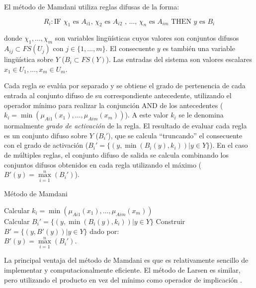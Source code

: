 El método de Mamdani utiliza reglas difusas de la forma:

\begin{equation}
R_{i}: \text{IF }\chi_{1}\text{ es }A_{i1}\text{, }\chi_{2}\text{ es }A_{i2}\text{ , \ldots , }\chi_{n}\text{ es }A_{im}\text{ THEN } y \text{ es } B_i
\end{equation}

donde $\chi_1,\ldots,\chi_m$ son variables lingüísticas cuyos valores son conjuntos difusos $A_{ij} \subset FS(U_j)$ con $j\in\{1,\ldots,m\}$. El consecuente $y$ es también una variable lingüística sobre $Y$ ($B_i \subset FS(Y)$). Las entradas del sistema son valores escalares $x_1 \in U_1,\ldots,x_m \in U_m$. 

Cada regla se evalúa por separado y se obtiene el grado de pertenencia de cada entrada al conjunto difuso de su correspondiente antecedente, utilizando el operador mínimo para realizar la conjunción AND de los antecedentes ($k_i = \min(\mu_{Ai1}(x_1),\ldots,\mu_{Aim}(x_m))$). A este valor $k_i$ se le denomina normalmente \emph{grado de activación} de la regla. El resultado de evaluar cada regla es un conjunto difuso sobre $Y$ ($B_i'$), que se calcula ``truncando'' el consecuente con el grado de activación ($B_i' = \{(y,\min(B_i(y),k_i))|y \in Y\}$). En el caso de múltiples reglas, el conjunto difuso de salida se calcula combinando los conjuntos difusos obtenidos en cada regla utilizando el máximo ($B'(y) = \max\limits_{i=1}^{n}(B_i')$).

\begin{algorithm}
\caption{Método de Mamdani}
\label{algo:mamdani}
\DontPrintSemicolon
{}
 {
Calcular $k_i = \min(\mu_{Ai1}(x_1),\ldots,\mu_{Aim}(x_m))$ \\
Calcular $B_i' = \{(y,\min(B_i(y),k_i))|y \in Y\}$
}
Construir $B' = \{(y, B'(y))|y \in Y\}$ dado por: \\
\centering
\nonl $B'(y) = \max\limits_{i=1}^{n}(B_i')$.\\
\;
\end{algorithm}

La principal ventaja del método de Mamdani es que es relativamente sencillo de implementar y computacionalmente eficiente. El método de Larsen es similar, pero utilizando el producto en vez del mínimo como operador de implicación \cite{larsen1980}.

